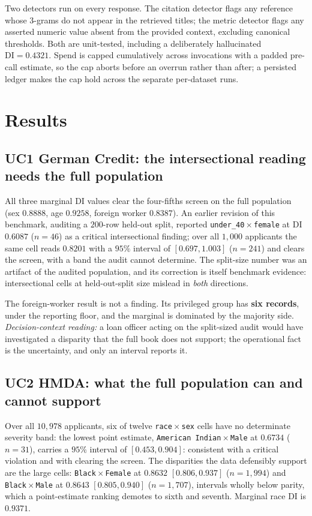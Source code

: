 \documentclass[10pt,letterpaper]{article}
\begin{document}
Two detectors run on every response. The citation detector flags any reference
whose 3-grams do not appear in the retrieved titles; the metric detector flags
any asserted numeric value absent from the provided context, excluding canonical
thresholds. Both are unit-tested, including a deliberately hallucinated
$\mathrm{DI}=0.4321$. Spend is capped cumulatively across invocations with a
padded pre-call estimate, so the cap aborts before an overrun rather than after;
a persisted ledger makes the cap hold across the separate per-dataset runs.

\section{Results}

\subsection{UC1 German Credit: the intersectional reading needs the full population}

All three marginal DI values clear the four-fifths screen on the full
population (sex $0.8888$, age $0.9258$, foreign worker $0.8387$). An earlier
revision of this benchmark, auditing a $200$-row held-out split, reported
\texttt{under\_40}\,$\times$\,\texttt{female} at DI $0.6087$ ($n{=}46$) as a
critical intersectional finding; over all $1{,}000$ applicants the same cell
reads $\mathbf{0.8201}$ with a $95\%$ interval of $[0.697, 1.003]$ ($n{=}241$)
and clears the screen, with a band the audit cannot determine. The
split-size number was an artifact of the audited population, and its
correction is itself benchmark evidence: intersectional cells at held-out-split
size mislead in \emph{both} directions.

The foreign-worker result is not a finding. Its privileged group has
\textbf{six records}, under the reporting floor, and the marginal is dominated
by the majority side. \emph{Decision-context reading:} a loan officer acting
on the split-sized audit would have investigated a disparity that the full
book does not support; the operational fact is the uncertainty, and only an
interval reports it.

\subsection{UC2 HMDA: what the full population can and cannot support}

Over all $10{,}978$ applicants, six of twelve
\texttt{race}\,$\times$\,\texttt{sex} cells have no determinate severity band:
the lowest point estimate, \texttt{American Indian}\,$\times$\,\texttt{Male}
at $0.6734$ ($n{=}31$), carries a $95\%$ interval of $[0.453, 0.904]$:
consistent with a critical violation and with clearing the screen. The
disparities the data defensibly support are the large cells:
\texttt{Black}\,$\times$\,\texttt{Female} at $0.8632$ $[0.806, 0.937]$
($n{=}1{,}994$) and \texttt{Black}\,$\times$\,\texttt{Male} at $0.8643$
$[0.805, 0.940]$ ($n{=}1{,}707$), intervals wholly below parity, which a
point-estimate ranking demotes to sixth and seventh. Marginal race DI is
$0.9371$.
\end{document}
